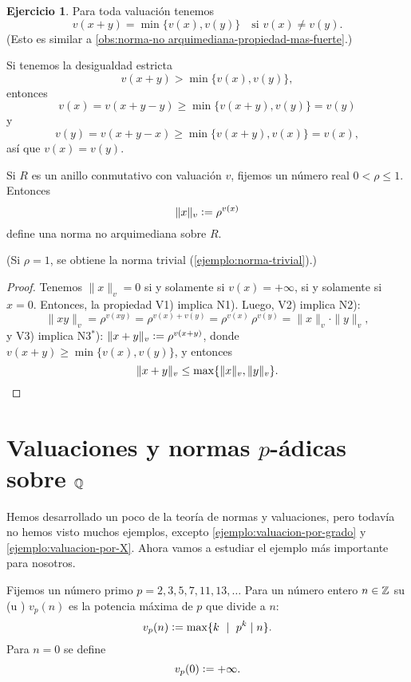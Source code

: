 \documentclass{article}
\numberwithin{equation}{section}
\theoremstyle{definition}
\newtheorem{ejerc}{Ejercicio}
\begin{document}
\begin{ejerc}
  \label{ejerc:valuacion-propiedad-mas-fuerte}
  Para toda valuación tenemos
  $$v (x + y) = \min \{ v (x), v (y) \} \quad\text{si } v (x) \ne v (y).$$
  (Esto es similar a \ref{obs:norma-no arquimediana-propiedad-mas-fuerte}.)

  \ifdefined\solutions\begin{solucion}
    Si tenemos la desigualdad estricta
    $$v (x+y) > \min \{ v (x), v (y) \},$$
    entonces
    $$v (x) = v (x+y-y) \ge \min \{ v (x+y), v (y) \} = v (y)$$
    y
    $$v (y) = v (x+y-x) \ge \min \{ v (x+y), v (x) \} = v (x),$$
    así que $v (x) = v (y)$.
  \end{solucion}\fi
\end{ejerc}

\begin{observacion}
  \label{obs:norma-a-partir-de-valuacion}
  Si $R$ es un anillo conmutativo con valuación $v$, fijemos un número real
  $0 < \rho \le 1$. Entonces
  $$\|x\|_v \mathrel{\mathop:}= \rho^{v (x)}$$
  define una norma no arquimediana sobre $R$.
\end{observacion}

\noindent (Si $\rho = 1$, se obtiene la norma trivial
(\ref{ejemplo:norma-trivial}).)

\begin{proof}
  Tenemos $\|x\|_v = 0$ si y solamente si $v (x) = +\infty$, si y solamente si
  $x = 0$. Entonces, la propiedad V1) implica N1). Luego, V2) implica N2):
  \[ \|xy\|_v =
     \rho^{v (xy)} =
     \rho^{v (x) + v (y)} =
     \rho^{v (x)}\,\rho^{v (y)} =
     \|x\|_v\cdot \|y\|_v, \]
  y V3) implica N3${}^*$): $\|x+y\|_v \mathrel{\mathop:}= \rho^{v (x+y)}$, donde
  $v (x+y) \ge \min \{ v (x), v (y) \}$, y entonces
  \[ \|x+y\|_v \le \max \{ \|x\|_v, \|y\|_v \}. \qedhere \]
\end{proof}


\section{Valuaciones y normas $p$-ádicas sobre $\mathbb{Q}$}

Hemos desarrollado un poco de la teoría de normas y valuaciones, pero todavía
no hemos visto muchos ejemplos, excepto \ref{ejemplo:valuacion-por-grado} y
\ref{ejemplo:valuacion-por-X}. Ahora vamos a estudiar el ejemplo más importante
para nosotros.

\begin{definicion}
  Fijemos un número primo $p = 2,3,5,7,11,13,\ldots$ Para un número entero
  $n \in \mathbb{Z}$ su  (u ) $v_p (n)$
  es la potencia máxima de $p$ que divide a $n$:
  $$v_p (n) \mathrel{\mathop:}= \max \{ k ~\mid~ p^k \mid n \}.$$
  Para $n = 0$ se define
  $$v_p (0) \mathrel{\mathop:}= +\infty.$$
\end{definicion}
\end{document}
